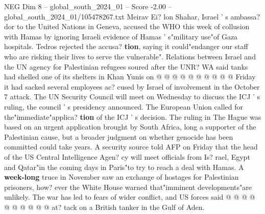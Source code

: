 \begin{textsample}{NEG Dim 8 – global\_south\_2024\_01 – Score -2.00 – global\_south\_2024\_01/105478267.txt}
Meirav Ei? lon Shahar, Israel ' s ambassa? dor to the United Nations in Geneva, accused the WHO this week of collusion with Hamas by ignoring Israeli evidence of Hamas ' s"military use"of Gaza hospitals.
Tedros rejected the accusa? \textbf{tion}, saying it could"endanger our staff who are risking their lives to serve the vulnerable".
Relations between Israel and the UN agency for Palestinian refugees soured after the UNR?
WA said tanks had shelled one of its shelters in Khan Yunis on @ @ @ @ @ @ @ @ @ @ Friday it had sacked several employees ac? cused by Israel of involvement in the October 7 attack.
The UN Security Council will meet on Wednesday to discuss the ICJ ' s ruling, the council ' s presidency announced.
The European Union called for the"immediate"applica? \textbf{tion} of the ICJ ' s decision.
The ruling in The Hague was based on an urgent application brought by South Africa, long a supporter of the Palestinian cause, but a broader judgment on whether genocide has been committed could take years.
A security source told AFP on Friday that the head of the US Central Intelligence Agen? cy will meet officials from Is? rael, Egypt and Qatar"in the coming days in Paris"to try to reach a deal with Hamas.
A \textbf{week-long} truce in November saw an exchange of hostages for Palestinian prisoners, how? ever the White House warned that"imminent developments"are unlikely.
The war has led to fears of wider conflict, and US forces said @ @ @ @ @ @ @ @ @ @ at? tack on a British tanker in the Gulf of Aden.

\end{textsample}

